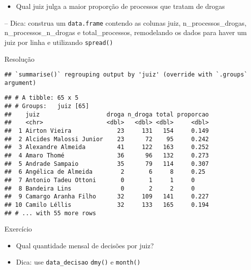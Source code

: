 \documentclass[
  10pt,
  ignorenonframetext,
]{beamer}
\providecommand{\tightlist}{%
  \setlength{\itemsep}{0pt}\setlength{\parskip}{0pt}}
\begin{document}
\begin{frame}[fragile]{}
\protect\hypertarget{section-6}{}
\begin{itemize}
\tightlist
\item
  Qual juiz julga a maior proporção de processos que tratam de drogas
\end{itemize}

-- Dica: construa um \texttt{data.frame} contendo as colunas juiz,
n\_processos\_drogas, n\_processos\_n\_drogas e total\_processos,
remodelando os dados para haver um juiz por linha e utilizando
\texttt{spread()}
\end{frame}

\begin{frame}[fragile]{Resolução}
\protect\hypertarget{resoluuxe7uxe3o}{}
\begin{verbatim}
## `summarise()` regrouping output by 'juiz' (override with `.groups` argument)
\end{verbatim}

\begin{verbatim}
## # A tibble: 65 x 5
## # Groups:   juiz [65]
##    juiz                   droga n_droga total proporcao
##    <chr>                  <dbl>   <dbl> <dbl>     <dbl>
##  1 Airton Vieira             23     131   154     0.149
##  2 Alcides Malossi Junior    23      72    95     0.242
##  3 Alexandre Almeida         41     122   163     0.252
##  4 Amaro Thomé               36      96   132     0.273
##  5 Andrade Sampaio           35      79   114     0.307
##  6 Angélica de Almeida        2       6     8     0.25 
##  7 Antonio Tadeu Ottoni       0       1     1     0    
##  8 Bandeira Lins              0       2     2     0    
##  9 Camargo Aranha Filho      32     109   141     0.227
## 10 Camilo Léllis             32     133   165     0.194
## # ... with 55 more rows
\end{verbatim}
\end{frame}

\begin{frame}[fragile]{Exercício}
\protect\hypertarget{exercuxedcio}{}
\begin{itemize}
\item
  Qual quantidade mensal de decisões por juiz?
\item
  Dica: use \texttt{data\_decisao} \texttt{dmy()} e \texttt{month()}
\end{itemize}
\end{frame}
\end{document}
